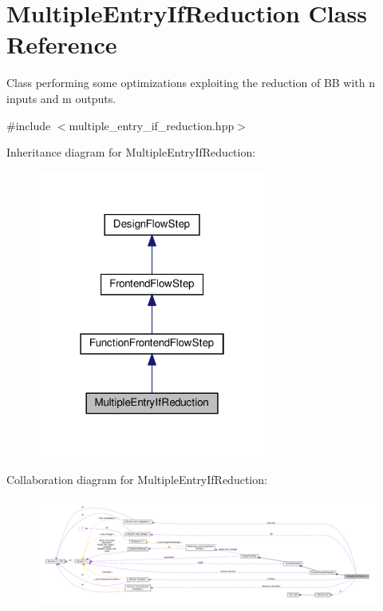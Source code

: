 \hypertarget{classMultipleEntryIfReduction}{}\section{Multiple\+Entry\+If\+Reduction Class Reference}
\label{classMultipleEntryIfReduction}


Class performing some optimizations exploiting the reduction of BB with n inputs and m outputs.  




{\ttfamily \#include $<$multiple\+\_\+entry\+\_\+if\+\_\+reduction.\+hpp$>$}



Inheritance diagram for Multiple\+Entry\+If\+Reduction\+:
\nopagebreak
\begin{figure}[H]
\begin{center}
\leavevmode
\includegraphics[width=214pt]{d6/ddd/classMultipleEntryIfReduction__inherit__graph}
\end{center}
\end{figure}


Collaboration diagram for Multiple\+Entry\+If\+Reduction\+:
\nopagebreak
\begin{figure}[H]
\begin{center}
\leavevmode
\includegraphics[width=350pt]{dd/d25/classMultipleEntryIfReduction__coll__graph}
\end{center}
\end{figure}
